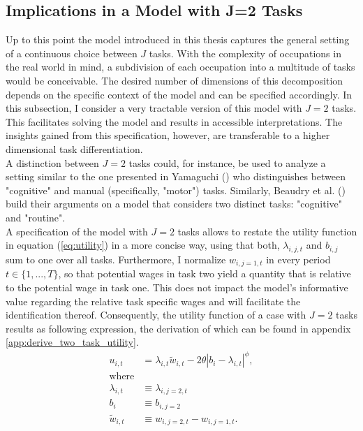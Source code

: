 \documentclass[../main.tex]{subfiles}
\begin{document}
\subsection{Implications in a Model with J=2 Tasks} \label{sec:implications-with-j=2}
Up to this point the model introduced in this thesis captures the general setting of a continuous choice between $J$ tasks. With the complexity of occupations in the real world in mind, a subdivision of each occupation into a multitude of tasks would be conceivable. The desired number of dimensions of this decomposition depends on the specific context of the model and can be specified accordingly. In this subsection, I consider a very tractable version of this model with $J=2$ tasks. This facilitates solving the model and results in accessible interpretations. The insights gained from this specification, however, are transferable to a higher dimensional task differentiation.
\\
A distinction between $J=2$ tasks could, for instance, be used to analyze a setting similar to the one presented in Yamaguchi (\citeyear{yamaguchi2018changes}) who distinguishes between "cognitive" and manual (specifically, "motor") tasks. Similarly, Beaudry et al. (\citeyear{beaudry2016great}) build their arguments on a model that considers two distinct tasks: "cognitive" and "routine". 
\\
A specification of the model with $J=2$ tasks allows to restate the utility function in equation (\ref{eq:utility}) in a more concise way, using that both, $\lambda_{i,j,t}$ and $b_{i,j}$ sum to one over all tasks. Furthermore, I normalize $w_{i,j=1,t}$  in every period $t \in \{1, ..., T\}$, so that potential wages in task two yield a quantity that is relative to the potential wage in task one. This does not impact the model's informative value regarding the relative task specific wages and will facilitate the identification thereof. Consequently, the utility function of a case with $J=2$ tasks results as following expression, the derivation of which can be found in appendix \ref{app:derive_two_task_utility}.
\begin{align}\label{eq:two_task_utility}
	u_{i,t} 		& = \lambda_{i,t} \tilde{w}_{i,t} - 2 \theta |b_i - \lambda_{i,t}|^\phi,  \\
	\text{where} 	& {} \nonumber \\
	\lambda_{i,t} 	& \equiv \lambda_{i,j=2,t}  \nonumber \\
	b_i 			& \equiv b_{i,j=2} \nonumber \\
	\tilde{w}_{i,t} & \equiv w_{i,j=2,t} - w_{i,j=1,t}. \nonumber
\end{align}
\end{document}
